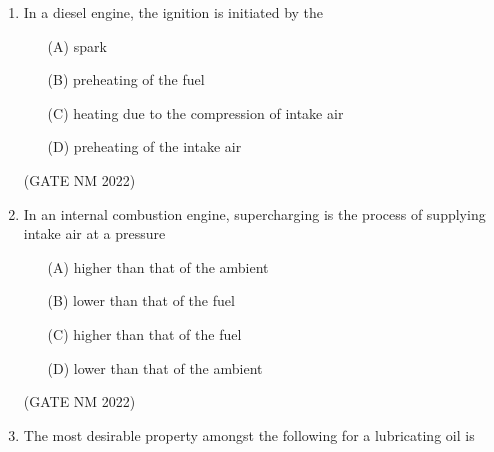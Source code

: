 \documentclass[journal,12pt,onecolumn]{IEEEtran}
\theoremstyle{remark}
\begin{document}
\begin{enumerate}
	\begin{multicols}{4}

\begin{enumerate}
    \item[(A)] 60.4 and 80
    \item[(B)] 13.4 and 80
    \item[(C)] 13.4 and 4
    \item[(D)] 60.4 and 4
\end{enumerate}

	\end{multicols}

\hfill(GATE NM 2022)





\item  In a diesel engine, the ignition is initiated by the

	\begin{multicols}{2}

\begin{enumerate}
    \item[(A)] spark
    \item[(B)] preheating of the fuel
    \item[(C)] heating due to the compression of intake air
    \item[(D)] preheating of the intake air
\end{enumerate}

	\end{multicols}

\hfill(GATE NM 2022)



\item  In an internal combustion engine, supercharging is the process of supplying intake air at a pressure

\begin{enumerate}
    \item[(A)] higher than that of the ambient
    \item[(B)] lower than that of the fuel
    \item[(C)] higher than that of the fuel
    \item[(D)] lower than that of the ambient
\end{enumerate}

\hfill(GATE NM 2022)






\item  The most desirable property amongst the following for a lubricating oil is


\end{enumerate}
\end{document}
